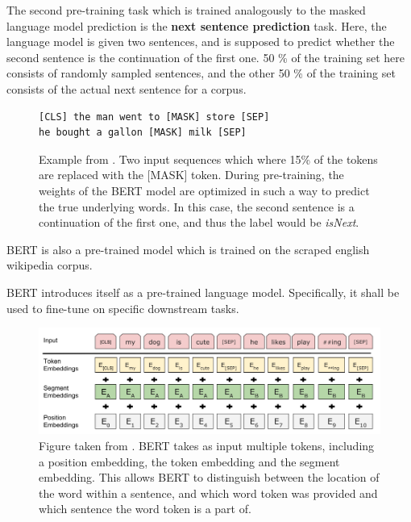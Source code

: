 \documentclass[a4paper,12pt,twoside,openright]{report}
\begin{document}
The second pre-training task which is trained analogously to the masked language model prediction is the \textbf{next sentence prediction} task.
Here, the language model is given two sentences, and is supposed to predict whether the second sentence is the continuation of the first one.
50 \% of the training set here consists of randomly sampled sentences, and the other 50 \% of the training set consists of the actual next sentence for a corpus.

\begin{figure}[H]
\begin{verbatim}
[CLS] the man went to [MASK] store [SEP]
he bought a gallon [MASK] milk [SEP]
\end{verbatim}
\caption{Example from \cite{devlin18}. 
Two input sequences which where 15\% of the tokens are replaced with the [MASK] token. 
During pre-training, the weights of the BERT model are optimized in such a way to predict the true underlying words.
In this case, the second sentence is a continuation of the first one, and thus the label would be \textit{isNext}.
}
\end{figure}




BERT is also a pre-trained model which is trained on the scraped english wikipedia corpus.

BERT introduces itself as a pre-trained language model.
Specifically, it shall be used to fine-tune on specific downstream tasks.



\begin{figure}[h]
	\center
  \includegraphics[width=\linewidth]{./assets/background/BERT_multiple_input_tokens.png}
  \caption{Figure taken from \cite{devlin18}. BERT takes as input multiple tokens, including a position embedding, the token embedding and the segment embedding. This allows BERT to distinguish between the location of the word within a sentence, and which word token was provided and which sentence the word token is a part of.}
  \label{fig:cbow_skipgram}
\end{figure}
\end{document}
